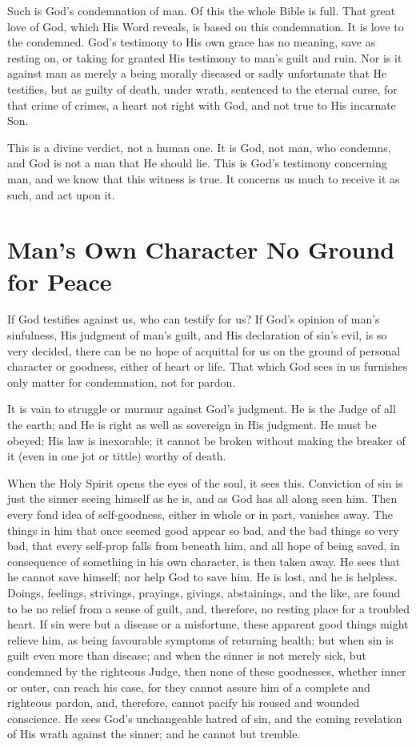 \documentclass[
]{book}
\begin{document}
Such is God's condemnation of man. Of this the whole Bible is full. That great love of God, which His Word reveals, is based on this condemnation. It is love to the condemned. God's testimony to His own grace has no meaning, save as resting on, or taking for granted His testimony to man's guilt and ruin. Nor is it against man as merely a being morally diseased or sadly unfortunate that He testifies, but as guilty of death, under wrath, sentenced to the eternal curse, for that crime of crimes, a heart not right with God, and not true to His incarnate Son.

This is a divine verdict, not a human one. It is God, not man, who condemns, and God is not a man that He should lie. This is God's testimony concerning man, and we know that this witness is true. It concerns us much to receive it as such, and act upon it.

\hypertarget{mans-own-character-no-ground-for-peace}{%
\chapter{Man's Own Character No Ground for Peace}\label{mans-own-character-no-ground-for-peace}}

If God testifies against us, who can testify for us? If God's opinion of man's sinfulness, His judgment of man's guilt, and His declaration of sin's evil, is so very decided, there can be no hope of acquittal for us on the ground of personal character or goodness, either of heart or life. That which God sees in us furnishes only matter for condemnation, not for pardon.

It is vain to struggle or murmur against God's judgment. He is the Judge of all the earth; and He is right as well as sovereign in His judgment. He must be obeyed; His law is inexorable; it cannot be broken without making the breaker of it (even in one jot or tittle) worthy of death.

When the Holy Spirit opens the eyes of the soul, it sees this. Conviction of sin is just the sinner seeing himself as he is, and as God has all along seen him. Then every fond idea of self-goodness, either in whole or in part, vanishes away. The things in him that once seemed good appear so bad, and the bad things so very bad, that every self-prop falls from beneath him, and all hope of being saved, in consequence of something in his own character, is then taken away. He sees that he cannot save himself; nor help God to save him. He is lost, and he is helpless. Doings, feelings, strivings, prayings, givings, abstainings, and the like, are found to be no relief from a sense of guilt, and, therefore, no resting place for a troubled heart. If sin were but a disease or a misfortune, these apparent good things might relieve him, as being favourable symptoms of returning health; but when sin is guilt even more than disease; and when the sinner is not merely sick, but condemned by the righteous Judge, then none of these goodnesses, whether inner or outer, can reach his case, for they cannot assure him of a complete and righteous pardon, and, therefore, cannot pacify his roused and wounded conscience. He sees God's unchangeable hatred of sin, and the coming revelation of His wrath against the sinner; and he cannot but tremble.
\end{document}
